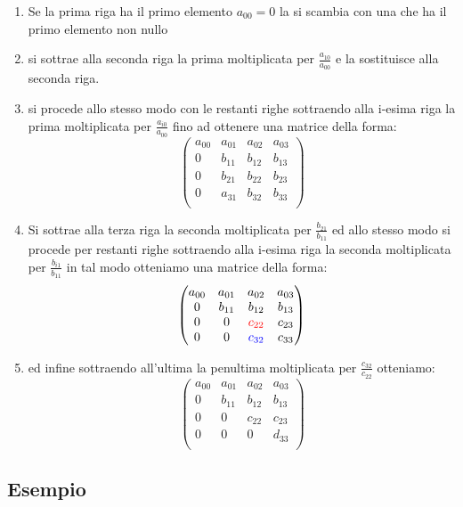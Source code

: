 \documentclass[10pt,a4paper]{article}
\begin{document}
\begin{enumerate}
	\item Se la prima riga ha il primo elemento $ a_{0 0}=0 $  la si scambia con una che ha il primo elemento non nullo
	\item si sottrae alla seconda riga la prima moltiplicata per $ \frac{a_{10}}{a_{00}} $ e la sostituisce alla seconda riga.
	\item si procede allo stesso  modo  con le restanti righe  sottraendo alla i-esima riga la prima moltiplicata per $  \frac{a_{i0}}{a_{00}}$ fino ad ottenere una matrice della forma:
	\[\begin{pmatrix}
	a_{0 0}&a_{0 1}&a_{0 2}&a_{0 3}\\
	0&b_{1 1}&b_{1 2}&b_{1 3}\\
	0&b_{2 1}&b_{2 2}&b_{2 3}\\
	0&a_{3 1}&b_{3 2}&b_{3 3}\\
	\end{pmatrix}\]
	\item Si sottrae alla terza riga la seconda moltiplicata per $ \frac{b_{21}}{b_{11}} $  ed allo stesso modo si procede per restanti righe sottraendo alla i-esima riga la seconda moltiplicata per $ \frac{b_{i1}}{b_{11}} $  in tal modo otteniamo una matrice della forma:
	\[\begin{pmatrix}
	a_{0 0}&a_{0 1}&a_{0 2}&a_{0 3}\\
	0&b_{1 1}&b_{1 2}&b_{1 3}\\
	0&0&\color{red}c_{2 2}&c_{2 3}\\
	0&0&\color{blue}c_{3 2}&c_{3 3}\\
	\end{pmatrix}\]
	\item ed infine sottraendo all'ultima la penultima moltiplicata per {\color{red}$ \frac{c_{32}}{c_{22}} $} otteniamo:
	\[\begin{pmatrix}
	a_{0 0}&a_{0 1}&a_{0 2}&a_{0 3}\\
	0&b_{1 1}&b_{1 2}&b_{1 3}\\
	0&0&c_{2 2}&c_{2 3}\\
	0&0&0&d_{3 3}\\
	\end{pmatrix}\]	
	
\end{enumerate}
\subsection{Esempio}
\end{document}
